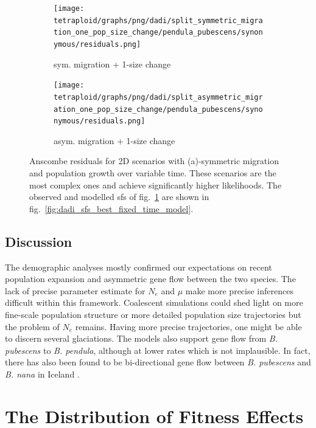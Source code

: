 \documentclass[hidelinks,11pt]{article}
\newcommand{\pendula}{\textit{B. pendula}}
\newcommand{\pubescens}{\textit{B. pubescens}}
\newcommand{\nana}{\textit{B. nana}}
\begin{document}
    \begin{figure}[H]
        \centering
        \begin{subfigure}[b]{0.48\textwidth}
            \texttt{[image: tetraploid/graphs/png/dadi/split\_symmetric\_migration\_one\_pop\_size\_change/pendula\_pubescens/synonymous/residuals.png]}
            \caption{sym. migration + 1-size change}
        \end{subfigure}
        \hfill
        \begin{subfigure}[b]{0.503\textwidth}
            \texttt{[image: tetraploid/graphs/png/dadi/split\_asymmetric\_migration\_one\_pop\_size\_change/pendula\_pubescens/synonymous/residuals.png]}
            \caption{asym. migration + 1-size change\label{fig:dadi_2d_residuals_asymmetric_growth_variable_time}}
        \end{subfigure}
        \caption{Anscombe residuals for 2D scenarios with (a)-symmetric migration and population growth over variable time. These scenarios are the most complex ones and achieve significantly higher likelihoods. The observed and modelled \acrshort{sfs} of fig.~\ref{fig:dadi_2d_residuals_asymmetric_growth_variable_time} are shown in fig.~\ref{fig:dadi_sfs_best_fixed_time_model}.}
        \label{fig:dadi_2d_residuals_growth_variable_time}
    \end{figure}

    \subsection{Discussion}

    The demographic analyses mostly confirmed our expectations on recent population expansion and asymmetric gene flow between the two species. The lack of precise parameter estimate for $N_e$ and $\mu$ make more precise inferences difficult within this framework. Coalescent simulations could shed light on more fine-scale population structure or more detailed population size trajectories but the problem of $N_e$ remains. Having more precise trajectories, one might be able to discern several glaciations. The models also support gene flow from \pubescens{} to \pendula{}, although at lower rates which is not implausible. In fact, there has also been found to be bi-directional gene flow between \pubescens{} and \nana{} in Iceland \cite{birch-hybridisation-nana-pubescens}.

    \clearpage


    \section{The Distribution of Fitness Effects}
    \label{sec:dfe}
\end{document}
